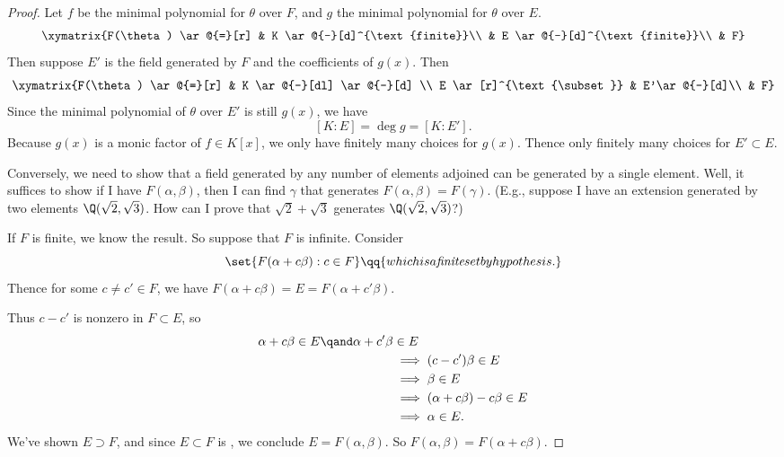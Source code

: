 \begin{proof}
Let $f$ be the minimal polynomial for $\theta$ over $F$, and $g$ the minimal polynomial for $\theta$ over $E$.
    \[
        \xymatrix{F(\theta) \ar@{=}[r] 
            & K \ar@{-}[d]^{\text{finite}}\\
            & E \ar@{-}[d]^{\text{finite}}\\
            & F}
    \]
    Then suppose $E'$ is the field generated by $F$ and the coefficients of $g(x)$. Then
    \[
        \xymatrix{F(\theta) \ar@{=}[r] 
            & K \ar@{-}[dl] \ar@{-}[d] \\
        E \ar[r]^{\text{\subset}} & E'\ar@{-}[d]\\
            & F}
    \]
    Since the minimal polynomial of $\theta$ over $E'$ is still $g(x)$, we have 
    \[
        [K:E] = \deg g = [K: E'].
    \]
    Because $g(x)$ is a monic factor of $f \in K[x]$, we only have finitely many choices for $g(x)$. Thence only finitely many choices for $E' \subset E$.

    Conversely, we need to show that a field generated by any number of elements adjoined can be generated by a single element. Well, it suffices to show if I have $F(\alpha, \beta)$, then I can find $\gamma$ that generates $F(\alpha, \beta) = F(\gamma)$. (E.g., suppose I have an extension generated by two elements $\Q(\sqrt{2}, \sqrt{3})$. How can I prove that $\sqrt{2} + \sqrt{3}$ generates $\Q(\sqrt{2}, \sqrt{3})$?)

    If $F$ is finite, we know the result. So suppose that $F$ is infinite. Consider 
    \[
        \set{F(\alpha + c \beta): c \in F} \qq{which is a \emph{finite} set by hypothesis.}
    \]
    Thence for some $c \neq c' \in F$, we have $F(\alpha + c \beta) = E = F(\alpha + c' \beta)$.

    Thus $c -c'$ is nonzero in $F \subset E$, so 
    \begin{align}
        \alpha + c \beta \in E \qand \alpha + c' \beta &\in E\\
        &\implies (c - c') \beta \in E\\
        &\implies \beta \in E\\
        &\implies (\alpha + c\beta) - c\beta \in E\\
        &\implies \alpha \in E.
    \end{align}
    We've shown $E \supset F$, and since $E \subset F$ is \TODO, we conclude $E = F(\alpha, \beta)$. So $F(\alpha, \beta) = F(\alpha + c\beta)$.
\end{proof}

